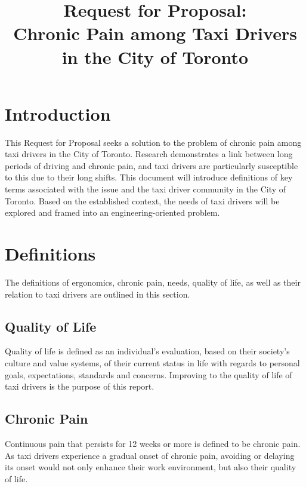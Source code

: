 \documentclass[11pt]{article}
\begin{document}
\title{Request for Proposal: \\Chronic Pain among Taxi Drivers in the
  City of Toronto}
\maketitle
\begin{abstract}

\end{abstract}
\tableofcontents
\section{Introduction}
\label{sec:intro}
This Request for Proposal seeks a solution to the problem of chronic
pain among taxi drivers in the City of Toronto. Research demonstrates a
link between long periods of driving and chronic pain\cite{KneePain,
Okunribido2008}, and taxi drivers are particularly susceptible to this
due to their long shifts\cite{thestar2012, KneePain}. This document will introduce
definitions of key terms associated with the issue and the taxi driver community
in the City of Toronto. Based on the established context, the needs of taxi drivers
will be explored and framed into an engineering-oriented problem. 

\section{Definitions}
\label{sec:defs}
The definitions of ergonomics, chronic pain, needs, quality of life, as
well as their relation to taxi drivers are outlined in this section.

\subsection{Quality of Life}
\label{sec:lifequal}

Quality of life is defined as an individual's evaluation, based on
their society's culture and value systems, of their current status in
life with regards to personal goals, expectations, standards and
concerns\cite{WHO}. Improving to the quality of life of taxi drivers is the
purpose of this report.

\subsection{Chronic Pain}
\label{sec:pain}

Continuous pain that persists for 12 weeks or more is defined to be
chronic pain\cite{chronic}. As taxi drivers experience a gradual onset of chronic
pain, avoiding or delaying its onset would not only enhance their work
environment, but also their quality of life.
\end{document}
